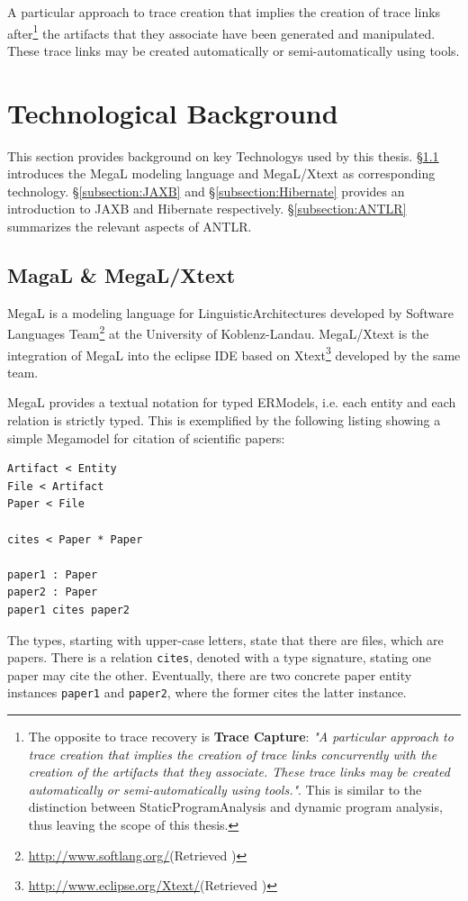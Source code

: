 \begin{definition}
A particular approach to trace creation that implies the creation of trace links after\footnote{The opposite to trace recovery is \textbf{Trace Capture}: \textit{"A particular approach to trace creation that implies the creation of trace links concurrently with the creation of the artifacts that they associate. These trace links may be created automatically or semi-automatically using tools."}\cite{DBLP:books/daglib/p/GotelCHZEGDAMM12}. This is similar to the distinction between \gls{StaticProgramAnalysis} and dynamic program analysis, thus leaving the scope of this thesis.} the artifacts that they associate have been generated and manipulated.
These trace links may be created automatically or semi-automatically using tools. 
\cite{DBLP:books/daglib/p/GotelCHZEGDAMM12}
\end{definition}


\section{Technological Background}
This section provides background on key \glspl{Technology} used by this thesis.
§\ref{subsection:MegaLXText} introduces the \gls{MegaL} modeling language and \gls{MegaL/Xtext} as corresponding technology.
§\ref{subsection:JAXB} and §\ref{subsection:Hibernate} provides an introduction to \gls{JAXB} and \gls{Hibernate} respectively.
§\ref{subsection:ANTLR} summarizes the relevant aspects of \gls{ANTLR}.

\subsection{MagaL \& MegaL/Xtext}
\label{subsection:MegaLXText}
\gls{MegaL} \cite{DBLP:conf/ecmdafa/LammelV14} \cite{DBLP:conf/models/FavreLV12} is a modeling language for \glspl{LinguisticArchitecture} developed by Software Languages Team\footnote{\url{http://www.softlang.org/}(Retrieved )} at the University of Koblenz-Landau.
\gls{MegaL/Xtext} \cite{LukasHaertelBScThesis} \cite{HaertelHHLV17} is the integration of \gls{MegaL} into the eclipse \gls{IDE} based on Xtext\footnote{\url{http://www.eclipse.org/Xtext/}(Retrieved )} developed by the same team.

\Gls{MegaL} provides a textual notation for typed \glspl{ERModel}, i.e. each entity and each relation is strictly typed.
This is exemplified by the following listing showing a simple \gls{Megamodel} for citation of scientific papers:
\begin{lstlisting}[numbers=none]
Artifact < Entity
File < Artifact
Paper < File

cites < Paper * Paper

paper1 : Paper
paper2 : Paper
paper1 cites paper2
\end{lstlisting}
The types, starting with upper-case letters, state that there are files, which are papers.
There is a relation \texttt{cites}, denoted with a type signature, stating one paper may cite the other.
Eventually, there are two concrete paper entity instances \texttt{paper1} and \texttt{paper2}, where the former cites the latter instance.

